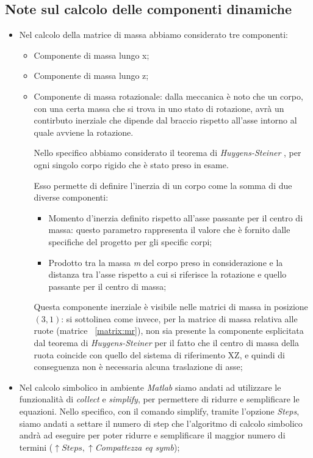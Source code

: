 \subsection{Note sul calcolo delle componenti dinamiche}
\begin{itemize}
	\item Nel calcolo della matrice di massa abbiamo considerato tre componenti:
	\begin{itemize}
		\item Componente di massa lungo x;
		\item Componente di massa lungo z;
		\item Componente di massa rotazionale: dalla meccanica è noto che un corpo, con una certa massa che si trova in uno stato di rotazione, avrà un contirbuto inerziale che dipende dal braccio rispetto all'asse intorno al quale avviene la rotazione.
		
		Nello specifico abbiamo considerato il teorema di \textit{Huygens-Steiner} , per ogni singolo corpo rigido che è stato preso in esame.
		
		Esso permette di definire l'inerzia di un corpo come la somma di due diverse componenti:
		\begin{itemize}
			\item Momento d'inerzia definito rispetto all'asse passante per il centro di massa: questo parametro rappresenta il valore che è fornito dalle specifiche del progetto per gli specific corpi;
			\item Prodotto tra la massa \textit{m} del corpo preso in considerazione e la distanza tra l'asse rispetto a cui si riferisce la rotazione e quello passante per il centro di massa;
		\end{itemize}
	
		Questa componente inerziale è visibile nelle matrici di massa in posizione $(3, 1)$: si sottolinea come invece, per la matrice di massa relativa alle ruote (matrice ~\ref{matrix:mr}), non sia presente la componente esplicitata dal teorema di \textit{Huygens-Steiner} per il fatto che il centro di massa della ruota coincide con quello del sistema di riferimento XZ, e quindi di conseguenza non è necessaria alcuna traslazione di asse;
 	\end{itemize}
 	\item Nel calcolo simbolico in ambiente \textit{Matlab} siamo andati ad utilizzare le funzionalità di \textit{collect} e \textit{simplify}, per permettere di ridurre e semplificare le equazioni. Nello specifico, con il comando simplify, tramite l'opzione \textit{Steps}, siamo andati a settare il numero di step che l'algoritmo di calcolo simbolico andrà ad eseguire per poter ridurre e semplificare il maggior numero di termini ($\uparrow Steps, \uparrow $\textit{Compattezza eq symb});
 	

\end{itemize}
